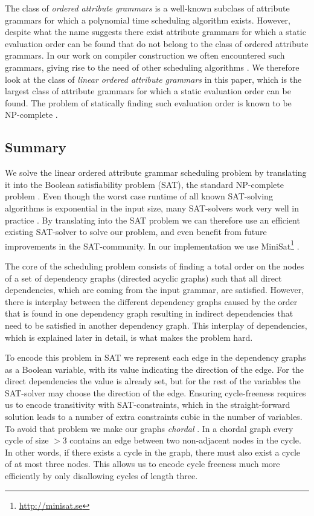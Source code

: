 \documentclass{llncs}
\begin{document}
The class of \emph{ordered attribute grammars} \cite{kastens80} is a well-known subclass of attribute grammars for which a polynomial time scheduling algorithm exists. However, despite what the name suggests there exist attribute grammars for which a static evaluation order can be found that do not belong to the class of ordered attribute grammars. In our work on compiler construction we often encountered such grammars, giving rise to the need of other scheduling algorithms \cite{bransen2012,Binsbergen:2015}. We therefore look at the class of \emph{linear ordered attribute grammars} in this paper, which is the largest class of attribute grammars for which a static evaluation order can be found. The problem of statically finding such evaluation order is known to be NP-complete \cite{engelfriet82}.

\subsection{Summary}
We solve the linear ordered attribute grammar scheduling problem by translating it into the Boolean satisfiability problem (SAT), the standard NP-complete problem \cite{Cook:1971}. Even though the worst case runtime of all known SAT-solving algorithms is exponential in the input size, many SAT-solvers work very well in practice \cite{sat-practice}. By translating into the SAT problem we can therefore use an efficient existing SAT-solver to solve our problem, and even benefit from future improvements in the SAT-community. In our implementation we use MiniSat\footnote{\url{http://minisat.se}} \cite{Een:2004}.

The core of the scheduling problem consists of finding a total order on the nodes of a set of dependency graphs (directed acyclic graphs) such that all direct dependencies, which are coming from the input grammar, are satisfied. However, there is interplay between the different dependency graphs caused by the order that is found in one dependency graph resulting in indirect dependencies that need to be satisfied in another dependency graph. This interplay of dependencies, which is explained later in detail, is what makes the problem hard.

To encode this problem in SAT we represent each edge in the dependency graphs as a Boolean variable, with its value indicating the direction of the edge. For the direct dependencies the value is already set, but for the rest of the variables the SAT-solver may choose the direction of the edge. Ensuring cycle-freeness requires us to encode transitivity with SAT-constraints, which in the straight-forward solution leads to a number of extra constraints cubic in the number of variables. To avoid that problem we make our graphs \emph{chordal} \cite{Dirac:1961}. In a chordal graph every cycle of size $> 3$ contains an edge between two non-adjacent nodes in the cycle. In other words, if there exists a cycle in the graph, there must also exist a cycle of at most three nodes. This allows us to encode cycle freeness much more efficiently by only disallowing cycles of length three.
\end{document}
